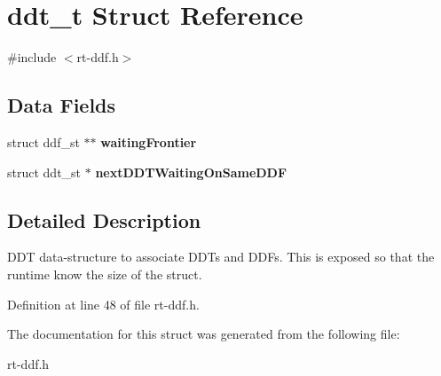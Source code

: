 \hypertarget{structddt__t}{\section{ddt\-\_\-t Struct Reference}
\label{structddt__t}
}


{\ttfamily \#include $<$rt-\/ddf.\-h$>$}

\subsection*{Data Fields}
\begin{DoxyCompactItemize}
\item 
\hypertarget{structddt__t_ab13e8ffaed67846c36e733fda7e530f3}{struct ddf\-\_\-st $\ast$$\ast$ {\bfseries waiting\-Frontier}}\label{structddt__t_ab13e8ffaed67846c36e733fda7e530f3}

\item 
\hypertarget{structddt__t_a408e9000528cf1e2dffc42ec7668f85e}{struct ddt\-\_\-st $\ast$ {\bfseries next\-D\-D\-T\-Waiting\-On\-Same\-D\-D\-F}}\label{structddt__t_a408e9000528cf1e2dffc42ec7668f85e}

\end{DoxyCompactItemize}


\subsection{Detailed Description}
D\-D\-T data-\/structure to associate D\-D\-Ts and D\-D\-Fs. This is exposed so that the runtime know the size of the struct. 

Definition at line 48 of file rt-\/ddf.\-h.



The documentation for this struct was generated from the following file\-:\begin{DoxyCompactItemize}
\item 
rt-\/ddf.\-h\end{DoxyCompactItemize}
